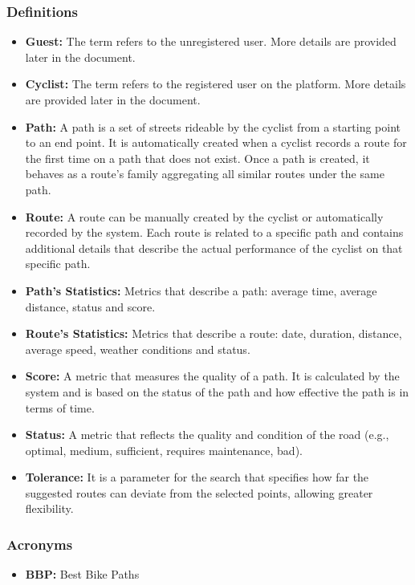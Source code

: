 \subsubsection{Definitions}
\begin{itemize}
    \item \textbf{Guest:} The term refers to the unregistered user. More details are provided later in the document.
    \item \textbf{Cyclist:} The term refers to the registered user on the platform. More details are provided later in the document.
    \item \textbf{Path:} A path is a set of streets rideable by the cyclist from a starting point to an end point. It is automatically created when a cyclist records a route for the first time on a path that does not exist. Once a path is created, it behaves as a route's family aggregating all similar routes under the same path.
    \item \textbf{Route:} A route can be manually created by the cyclist or automatically recorded by the system. Each route is related to a specific path and contains additional details that describe the actual performance of the cyclist on that specific path.
    \item \textbf{Path's Statistics:} Metrics that describe a path: average time, average distance, status and score.
    \item \textbf{Route's Statistics:} Metrics that describe a route: date, duration, distance, average speed, weather conditions and status.
    \item \textbf{Score:} A metric that measures the quality of a path. It is calculated by the system and is based on the status of the path and how effective the path is in terms of time. \\ 
    \item \textbf{Status:} A metric that reflects the quality and condition of the road (e.g., optimal, medium, sufficient, requires maintenance, bad).
    \item \textbf{Tolerance:} It is a parameter for the search that specifies how far the suggested routes can deviate from the selected points, allowing greater flexibility.
\end{itemize}
\subsubsection{Acronyms}
\begin{itemize}
    \item \textbf{BBP:} Best Bike Paths
\end{itemize}
